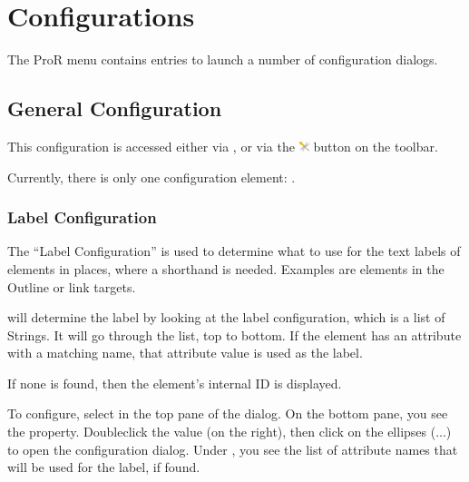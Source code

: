 
\section{Configurations}

The ProR menu contains entries to launch a number of configuration
dialogs.

\subsection{General Configuration}
\label{sec:general_configuration}

This configuration is accessed either via , or
via the \includegraphics[height=0.8em]{../rmf-images/ReqIFUIToolExtension.png} button on the toolbar.

Currently, there is only one configuration element: .

\subsubsection{Label Configuration}

The ``Label Configuration'' is used to determine what to use for the text labels of elements
in places, where a shorthand is needed.  Examples are elements in the Outline or link targets.

\pror{} will determine the label by looking at the label configuration, which is a list of Strings.
It will go through the list, top to bottom.  If the element has an attribute with a matching name,
that attribute value is used as the label.

If none is found, then the element's internal ID is displayed.

To configure, select  in the top pane of the dialog.  On the bottom pane,
you see the  property.  Doubleclick the value (on the right), then click on the
ellipses (...) to open the configuration dialog.  Under , you see the list of attribute
names that will be used for the label, if found.

